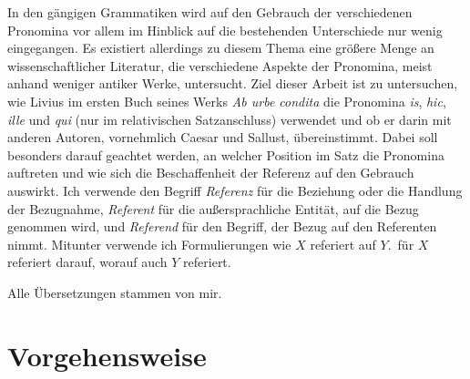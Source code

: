 \documentclass[12pt]{article}
\newcommand{\lat}[1]{\textit{#1}} %
\newcommand{\cntrl}[1]{#1} %
\begin{document}
In den gängigen Grammatiken wird auf den Gebrauch der verschiedenen Pronomina vor allem im Hinblick auf die bestehenden Unterschiede nur wenig eingegangen. Es existiert allerdings zu diesem Thema eine größere Menge an wissenschaftlicher Literatur, die verschiedene Aspekte der Pronomina, meist anhand weniger \cntrl{antiker Werke}, untersucht.
Ziel dieser Arbeit ist zu untersuchen, wie Livius im ersten Buch seines Werks \lat{Ab urbe condita} die Pronomina \lat{is}, \lat{hic}, \lat{ille} und \lat{qui} (nur im relativischen Satzanschluss) verwendet und ob er darin mit anderen Autoren, vornehmlich Caesar und Sallust, übereinstimmt.
Dabei soll besonders darauf geachtet werden, an welcher Position im Satz die Pronomina auftreten und wie sich die Beschaffenheit der Referenz auf den Gebrauch auswirkt.
Ich verwende den Begriff \textit{Referenz} für die Beziehung oder die Handlung der Bezugnahme, \textit{Referent} für die außersprachliche Entität, auf die Bezug genommen wird, und \textit{Referend} für den Begriff, der Bezug auf den Referenten nimmt.
Mitunter verwende ich Formulierungen wie \glqq $X$ referiert auf $Y$.\grqq\ für \glqq $X$ referiert darauf, worauf auch $Y$ referiert.\grqq

Alle Übersetzungen stammen von mir.

\section{Vorgehensweise}
\end{document}
